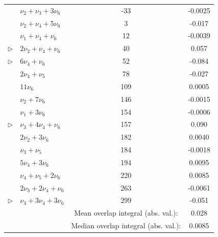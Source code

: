 \begin{table}
\begin{tabular}{llcc}
                 & $\nu_2 + \nu_3 +  3 \nu_6$                    &   -33 & -0.0025 \\
                 & $\nu_2 + \nu_4 +  5 \nu_6$                    &     3 & -0.017 \\
                 & $\nu_1 + \nu_4 + \nu_6$                       &    12 & -0.0039 \\
$\triangleright$ & $ 2 \nu_2 + \nu_4 + \nu_6$                    &    40 &  0.057 \\
$\triangleright$ & $ 6 \nu_4 + \nu_6$                            &    52 & -0.084 \\
                 & $ 2 \nu_4 + \nu_5$                            &    78 & -0.027 \\
                 & $11 \nu_6$                                    &   109 &  0.0005 \\
                 & $\nu_2 +  7 \nu_6$                            &   146 & -0.0015 \\
                 & $\nu_1 +  3 \nu_6$                            &   154 & -0.0006 \\
$\triangleright$ & $\nu_3 +  4 \nu_4 + \nu_6$                    &   157 &  0.090 \\
                 & $ 2 \nu_2 +  3 \nu_6$                         &   182 &  0.0040 \\
                 & $\nu_3 + \nu_5$                               &   184 & -0.0018 \\
                 & $ 5 \nu_4 +  3 \nu_6$                         &   194 &  0.0095 \\
                 & $\nu_4 + \nu_5 +  2 \nu_6$                    &   220 &  0.0085 \\
                 & $ 2 \nu_3 +  2 \nu_4 + \nu_6$                 &   263 & -0.0061 \\
$\triangleright$ & $\nu_3 +  3 \nu_4 +  3 \nu_6$                 &   299 & -0.051 \\
\midrule
& & Mean overlap integral (abs. val.): & 0.028 \\
& & Median overlap integral (abs. val.): & 0.0085 \\
  \end{tabular}\\[3mm]
\end{table}



